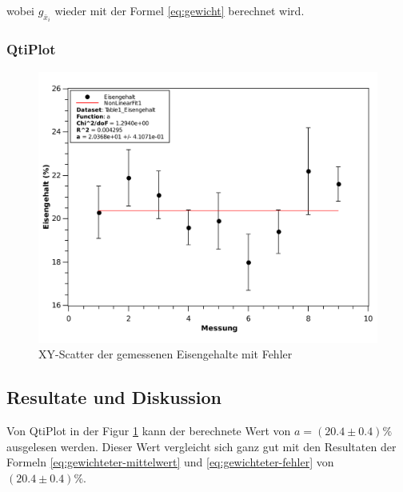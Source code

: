 wobei $g_{\bar{x}_i}$ wieder mit der Formel \ref{eq:gewicht} berechnet wird.


\subsubsection*{QtiPlot}

\begin{figure}[H]
    \center
    \includegraphics[width=.85\textwidth]{qtiplot/eisengehalt}
    \caption{XY-Scatter der gemessenen Eisengehalte mit Fehler}
    \label{fig:eisengehalt}
\end{figure}


\subsection{Resultate und Diskussion}

Von QtiPlot in der Figur \ref{fig:eisengehalt} kann der berechnete Wert von $a=(20.4 \pm 0.4)\textrm{\%}$
ausgelesen werden. Dieser Wert vergleicht sich ganz gut mit den Resultaten der Formeln
\ref{eq:gewichteter-mittelwert} und \ref{eq:gewichteter-fehler} von $(20.4 \pm 0.4)\textrm{\%}$.

